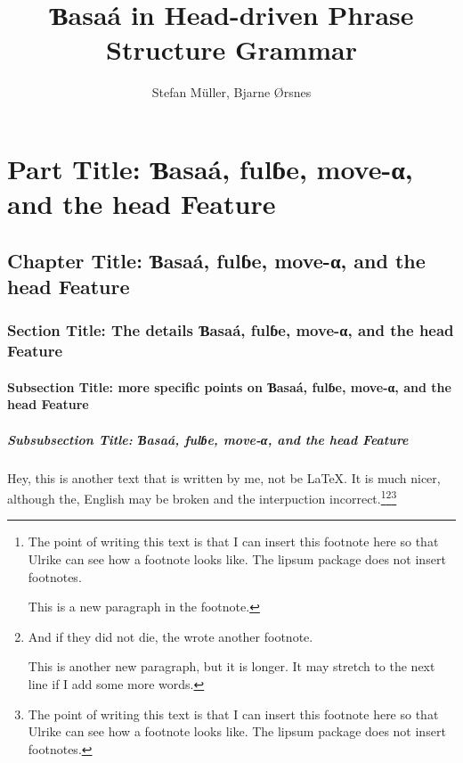\documentclass[ number=45
			   ,series=eotms
			   ,output=printondemand %
			  ]{langsci}
\title{Ɓasaá in \newlineCover Head-driven \newlineCover\newlineSpine Phrase Structure Grammar}
\author{Stefan Müller, \newlineCover Bjarne Ørsnes}
\begin{document}
               
        
                                    
                           
\maketitle                

\tableofcontents      
        
\part{Part Title: Ɓasaá, fulɓe, move-α, and the {\sc head} Feature}	               
\chapter{Chapter Title: Ɓasaá, fulɓe, move-α, and the {\sc head} Feature}
\section{Section Title: The details Ɓasaá, fulɓe, move-α, and the {\sc head} Feature}
\subsection{Subsection Title: more specific points on Ɓasaá, fulɓe, move-α, and the {\sc head} Feature}
\subsubsection{Subsubsection Title: Ɓasaá, fulɓe, move-α, and the {\sc head} Feature}       
                                                   

Hey, this is another text that is written by me, not be \LaTeX{}. It is much nicer, although the,
English may be broken and the interpuction incorrect.\footnote{%
  The point of writing this text is that I can insert this footnote here so that Ulrike can see how
  a footnote looks like. The lipsum package does not insert footnotes.

  This is a new paragraph in the footnote.
}\footnote{%
  And if they did not die, the wrote another footnote.

  This is another new paragraph, but it is longer. It may stretch to the next line if I add some
  more words.
}\footnote{%
  The point of writing this text is that I can insert this footnote here so that Ulrike can see how
  a footnote looks like. The lipsum package does not insert footnotes.
}
\end{document}
